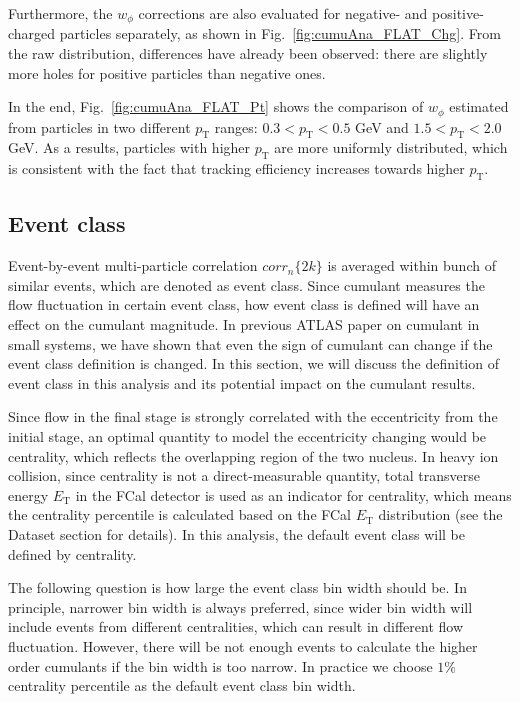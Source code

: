 Furthermore, the $w_\phi$ corrections are also evaluated for negative- and positive-charged particles separately, as shown in Fig.~\ref{fig:cumuAna_FLAT_Chg}. From the raw distribution, differences have already been observed: there are slightly more holes for positive particles than negative ones.

In the end, Fig.~\ref{fig:cumuAna_FLAT_Pt} shows the comparison of $w_\phi$ estimated from particles in two different $p_\text{T}$ ranges: $0.3<p_\text{T}<0.5$ GeV and $1.5<p_\text{T}<2.0$ GeV. As a results, particles with higher $p_\text{T}$ are more uniformly distributed, which is consistent with the fact that tracking efficiency increases towards higher $p_\text{T}$.



\subsection{Event class}
Event-by-event multi-particle correlation $corr_{n}\{2k\}$ is averaged within bunch of similar events, which are denoted as event class. Since cumulant measures the flow fluctuation in certain event class, how event class is defined will have an effect on the cumulant magnitude. In previous ATLAS paper on cumulant in small systems, we have shown that even the sign of cumulant can change if the event class definition is changed. In this section, we will discuss the definition of event class in this analysis and its potential impact on the cumulant results.

Since flow in the final stage is strongly correlated with the eccentricity from the initial stage, an optimal quantity to model the eccentricity changing would be centrality, which reflects the overlapping region of the two nucleus. In heavy ion collision, since centrality is not a direct-measurable quantity, total transverse energy $E_\text{T}$ in the FCal detector is used as an indicator for centrality, which means the centrality percentile is calculated based on the FCal $E_\text{T}$ distribution (see the Dataset section for details). In this analysis, the default event class will be defined by centrality.

The following question is how large the event class bin width should be. In principle, narrower bin width is always preferred, since wider bin width will include events from different centralities, which can result in different flow fluctuation. However, there will be not enough events to calculate the higher order cumulants if the bin width is too narrow. In practice we choose $1\%$ centrality percentile as the default event class bin width.

